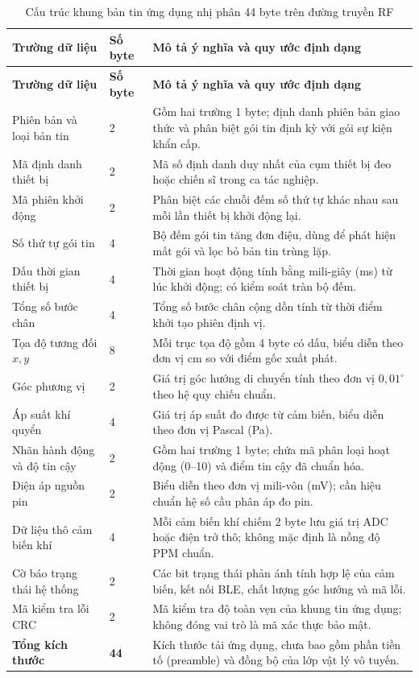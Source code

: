\begingroup\SmallTable
\begin{longtable}{|P{114bp}|P{35bp}|P{259bp}|}
\caption{Cấu trúc khung bản tin ứng dụng nhị phân 44 byte trên đường truyền RF}\label{tab:frame}\\\hline
\textbf{Trường dữ liệu}&\textbf{Số byte}&\textbf{Mô tả ý nghĩa và quy ước định dạng}\\\hline\endfirsthead
\hline\textbf{Trường dữ liệu}&\textbf{Số byte}&\textbf{Mô tả ý nghĩa và quy ước định dạng}\\\hline\endhead
Phiên bản và loại bản tin&2&Gồm hai trường 1 byte; định danh phiên bản giao thức và phân biệt gói tin định kỳ với gói sự kiện khẩn cấp.\\\hline
Mã định danh thiết bị&2&Mã số định danh duy nhất của cụm thiết bị đeo hoặc chiến sĩ trong ca tác nghiệp.\\\hline
Mã phiên khởi động&2&Phân biệt các chuỗi đếm số thứ tự khác nhau sau mỗi lần thiết bị khởi động lại.\\\hline
Số thứ tự gói tin&4&Bộ đếm gói tin tăng đơn điệu, dùng để phát hiện mất gói và lọc bỏ bản tin trùng lặp.\\\hline
Dấu thời gian thiết bị&4&Thời gian hoạt động tính bằng mili-giây (ms) từ lúc khởi động; có kiểm soát tràn bộ đếm.\\\hline
Tổng số bước chân&4&Tổng số bước chân cộng dồn tính từ thời điểm khởi tạo phiên định vị.\\\hline
Tọa độ tương đối $x,y$&8&Mỗi trục tọa độ gồm 4 byte có dấu, biểu diễn theo đơn vị cm so với điểm gốc xuất phát.\\\hline
Góc phương vị&2&Giá trị góc hướng di chuyển tính theo đơn vị $0{,}01^\circ$ theo hệ quy chiếu chuẩn.\\\hline
Áp suất khí quyển&4&Giá trị áp suất đo được từ cảm biến, biểu diễn theo đơn vị Pascal (Pa).\\\hline
Nhãn hành động và độ tin cậy&2&Gồm hai trường 1 byte; chứa mã phân loại hoạt động (0--10) và điểm tin cậy đã chuẩn hóa.\\\hline
Điện áp nguồn pin&2&Biểu diễn theo đơn vị mili-vôn (mV); cần hiệu chuẩn hệ số cầu phân áp đo pin.\\\hline
Dữ liệu thô cảm biến khí&4&Mỗi cảm biến khí chiếm 2 byte lưu giá trị ADC hoặc điện trở thô; không mặc định là nồng độ PPM chuẩn.\\\hline
Cờ báo trạng thái hệ thống&2&Các bit trạng thái phản ánh tính hợp lệ của cảm biến, kết nối BLE, chất lượng góc hướng và mã lỗi.\\\hline
Mã kiểm tra lỗi CRC&2&Mã kiểm tra độ toàn vẹn của khung tin ứng dụng; không đóng vai trò là mã xác thực bảo mật.\\\hline
\textbf{Tổng kích thước}&\textbf{44}&Kích thước tải ứng dụng, chưa bao gồm phần tiền tố (preamble) và đồng bộ của lớp vật lý vô tuyến.\\\hline
\end{longtable}\endgroup

